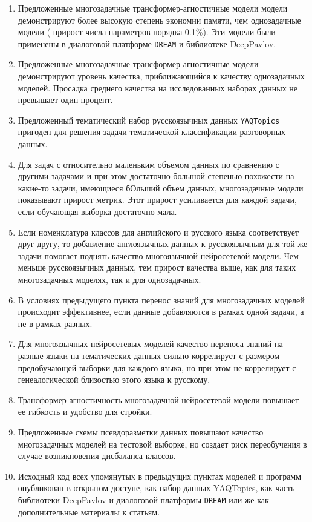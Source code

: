 \begin{enumerate}
\item Предложенные многозадачные трансформер-агностичные модели модели демонстрируют более высокую степень экономии памяти, чем однозадачные модели ( прирост числа параметров порядка 0.1\%). Эти модели были применены в диалоговой платформе \texttt{DREAM} и библиотеке DeepPavlov.
\item Предложенные многозадачные трансформер-агностичные модели демонстрируют уровень качества, приближающийся к качеству однозадачных моделей. Просадка среднего качества на исследованных наборах данных не превышает один процент.
\item Предложенный тематический набор русскоязычных данных \texttt{YAQTopics} пригоден для решения задачи тематической классификации разговорных данных.
\item Для задач с относительно маленьким объемом данных по сравнению с другими задачами и при этом достаточно большой степенью похожести на какие-то задачи, имеющиеся бОльший объем данных, многозадачные модели показывают прирост метрик. Этот прирост усиливается для каждой задачи, если обучающая выборка достаточно мала.
\item Если номенклатура классов для английского и русского языка соответствует друг другу, то добавление англоязычных данных к русскоязычным для той же задачи помогает поднять качество многоязычной нейросетевой модели. Чем меньше русскоязычных данных, тем прирост качества выше, как для таких многозадачных моделях, так и для однозадачных.
\item В условиях предыдущего пункта перенос знаний для многозадачных моделей происходит эффективнее, если данные добавляются в рамках одной задачи, а не в рамках разных.
\item Для многоязычных нейросетевых моделей качество переноса знаний на разные языки на тематических данных сильно коррелирует с размером предобучающей выборки для каждого языка, но при этом не коррелирует с генеалогической близостью этого языка к русскому.
\item Трансформер-агностичность многозадачной нейросетевой модели повышает ее гибкость и удобство для стройки.
\item Предложенные схемы псевдоразметки данных повышают качество многозадачных моделей на тестовой выборке, но создает риск переобучения в случае возникновения дисбаланса классов.
  \item Исходный код всех упомянутых в предыдущих пунктах моделей и программ опубликован в открытом доступе, как набор данных YAQTopics, как часть библиотеки DeepPavlov и диалоговой платформы \texttt{DREAM} или же как дополнительные материалы к статьям.
\end{enumerate}
